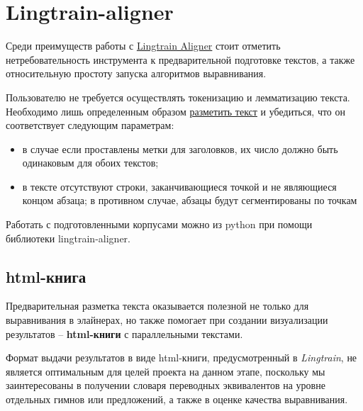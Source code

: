 \documentclass[
  letterpaper,
]{book}
\providecommand{\tightlist}{%
  \setlength{\itemsep}{0pt}\setlength{\parskip}{0pt}}\usepackage{longtable,booktabs,array}
\begin{document}

\hypertarget{sec-lingtrain}{%
\section{Lingtrain-aligner}\label{sec-lingtrain}}

Среди преимуществ работы с
\href{https://github.com/averkij/lingtrain-aligner}{Lingtrain Aligner}
стоит отметить нетребовательность инструмента к предварительной
подготовке текстов, а также относительную простоту запуска алгоритмов
выравнивания.

Пользователю не требуется осуществлять токенизацию и лемматизацию
текста. Необходимо лишь определенным образом
\href{https://habr.com/ru/articles/590549/}{разметить текст} и
убедиться, что он соответствует следующим параметрам:

\begin{itemize}
\tightlist
\item
  в случае если проставлены метки для заголовков, их число должно быть
  одинаковым для обоих текстов;
\item
  в тексте отсутствуют строки, заканчивающиеся точкой и не являющиеся
  концом абзаца; в противном случае, абзацы будут сегментированы по
  точкам
\end{itemize}

Работать с подготовленными корпусами можно из python при помощи
библиотеки lingtrain-aligner.

\hypertarget{html-ux43aux43dux438ux433ux430}{%
\subsection{html-книга}\label{html-ux43aux43dux438ux433ux430}}

Предварительная разметка текста оказывается полезной не только для
выравнивания в элайнерах, но также помогает при создании визуализации
результатов -- \textbf{html-книги} с параллельными текстами.

Формат выдачи результатов в виде html-книги, предусмотренный в
\emph{Lingtrain}, не является оптимальным для целей проекта на данном
этапе, поскольку мы заинтересованы в получении словаря переводных
эквивалентов на уровне отдельных гимнов или предложений, а также в
оценке качества выравнивания.
\end{document}
